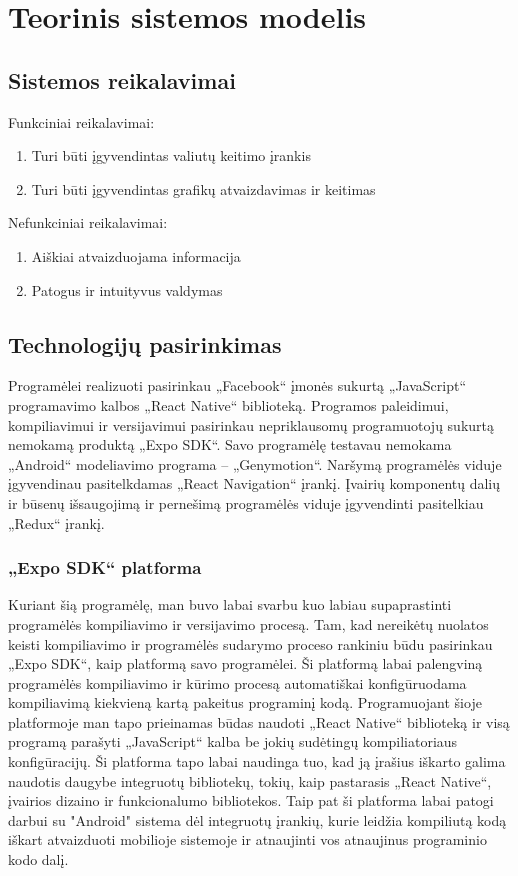 \documentclass[a4paper,12pt,fleqn]{article}
\begin{document}
\newpage
\section{Teorinis sistemos modelis}
\subsection{Sistemos reikalavimai}
Funkciniai reikalavimai:
\begin{enumerate}[leftmargin=2cm]
	\item Turi būti įgyvendintas valiutų keitimo įrankis
	\item Turi būti įgyvendintas grafikų atvaizdavimas ir keitimas
\end{enumerate}

Nefunkciniai reikalavimai:
\begin{enumerate}[leftmargin=2cm]
	\item Aiškiai atvaizduojama informacija
	\item Patogus ir intuityvus valdymas
\end{enumerate}

\subsection{Technologijų pasirinkimas}
Programėlei realizuoti pasirinkau „Facebook“ įmonės sukurtą „JavaScript“ programavimo kalbos „React Native“ biblioteką. Programos paleidimui, kompiliavimui ir versijavimui pasirinkau nepriklausomų programuotojų sukurtą nemokamą produktą „Expo SDK“. Savo programėlę testavau nemokama „Android“ modeliavimo programa – „Genymotion“. Naršymą programėlės viduje įgyvendinau pasitelkdamas „React Navigation“ įrankį. Įvairių komponentų dalių ir būsenų išsaugojimą ir pernešimą programėlės viduje įgyvendinti pasitelkiau „Redux“ įrankį.
\subsubsection{„Expo SDK“ platforma}
Kuriant šią programėlę, man buvo labai svarbu kuo labiau supaprastinti programėlės kompiliavimo ir versijavimo procesą. Tam, kad nereikėtų nuolatos keisti kompiliavimo ir programėlės sudarymo proceso rankiniu būdu pasirinkau „Expo SDK“, kaip platformą savo programėlei. Ši platformą labai palengviną programėlės kompiliavimo ir kūrimo procesą automatiškai konfigūruodama kompiliavimą kiekvieną kartą pakeitus programinį kodą. Programuojant šioje platformoje man tapo prieinamas būdas naudoti „React Native“ biblioteką ir visą programą parašyti „JavaScript“ kalba be jokių sudėtingų kompiliatoriaus konfigūracijų. Ši platforma tapo labai naudinga tuo, kad ją įrašius iškarto galima naudotis daugybe integruotų bibliotekų, tokių, kaip pastarasis „React Native“, įvairios dizaino ir funkcionalumo bibliotekos. Taip pat ši platforma labai patogi darbui su "Android" sistema dėl integruotų įrankių, kurie leidžia kompiliutą kodą iškart atvaizduoti mobilioje sistemoje ir atnaujinti vos atnaujinus programinio kodo dalį.
\end{document}
